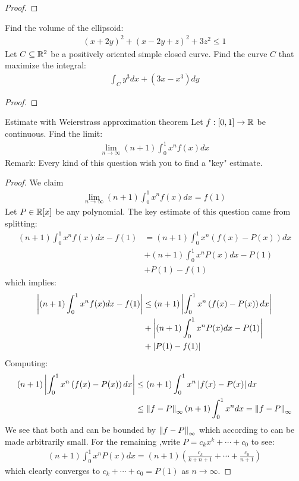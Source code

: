 \documentclass{report}
\begin{document}
\begin{proof}

\end{proof}
\begin{question}{}{}
Find the volume of the ellipsoid: 
\begin{align*}
  (x+2y)^2+ (x-2y+z)^2 +3z^2 \leq 1
\end{align*}
Let $C\subseteq \mathbb{R}^2$ be a positively oriented simple closed curve. Find the curve $C$ that maximize the integral: 
\begin{align*}
\int_C y^3 dx+ (3x-x^3)dy
\end{align*}
\end{question}
\begin{proof}

\end{proof}
\begin{question}{Estimate with Weierstrass approximation theorem}{}
Let $f:[0,1]\rightarrow \mathbb{R}$ be continuous. Find the limit: 
\begin{align*}
\lim_{n\to \infty}(n+1)\int_0^1 x^nf(x)dx
\end{align*}
Remark: Every kind of this question wish you to find a "key" estimate. 
\end{question}
\begin{proof}
We claim 
\begin{align}
\lim_{n\to \infty} (n+1) \int_0^1 x^nf(x)dx=f(1)
\end{align}
Let $P\in \mathbb{R}[x]$ be any polynomial. The key estimate of this question came from splitting: 
\begin{align*}
  (n+1)\int_0^1 x^nf(x)dx - f(1)&= (n+1) \int_0^1 x^n \left(f(x)-P(x)\right)dx \\
  &+ (n+1)\int_0^1 x^nP(x)dx -P(1) \\
  &+ P(1)-f(1)
\end{align*}
which implies: 
\begin{align}
 \label{EQpn1} \left|(n+1)\int_0^1 x^nf(x)dx-f(1)\right| &\leq  (n+1) \left|\int_0^1 x^n\left(f(x)-P(x)\right)dx\right|  \\
\label{EQpn2}  &+ \left|(n+1)\int_0^1 x^nP(x)dx-P(1)\right|\\
 \label{EQpn3} &+ \left|P(1)-f(1)\right|
\end{align}
Computing: 
\begin{align*}
  (n+1)\left|\int_0^1 x^n \left(f(x)-P(x) \right)dx\right| &\leq (n+1) \int_0^1 x^n \left|f(x)-P(x)\right|dx  \\
  &\leq \left\| f-P \right\|_{\infty} (n+1)\int_0^1 x^n dx= \left\| f-P \right\|_{\infty}
\end{align*}
We see that both  and  can be bounded by $\left\| f-P \right\|_{\infty}$ which according to  can be made arbitrarily small. For the remaining ,write $P=c_kx^k+ \cdots +c_0$ to see: 
\begin{align*}
  (n+1) \int_0^1 x^n P(x)dx= (n+1)\left( \frac{c_k}{k+n+1}+ \cdots + \frac{c_0}{n+1} \right) 
\end{align*}
which clearly converges to $c_k+\cdots + c_0=P(1)$ as $n\rightarrow  \infty $.
\end{proof}
\end{document}
